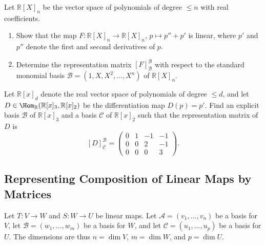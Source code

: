 \begin{exercise}
\label{exc:polynomial_differential_operator_matrix}
Let $\mathbb{R}[X]_n$ be the vector space of polynomials of degree $\le n$ with real coefficients.
\begin{enumerate}
    \item Show that the map $F \colon \mathbb{R}[X]_n \to \mathbb{R}[X]_n$, $p \mapsto p'' + p'$ is linear, where $p'$ and $p''$ denote the first and second derivatives of $p$.
    \item Determine the representation matrix $[F]_{\mathcal{B}}^{\mathcal{B}}$ with respect to the standard monomial basis $\mathcal{B} = (1, X, X^2, \dots, X^n)$ of $\mathbb{R}[X]_n$.
\end{enumerate}
\end{exercise}

\begin{exercise}
\label{exc:differentiation_customized_bases}
Let $\mathbb{R}[x]_d$ denote the real vector space of polynomials of degree $\le d$, and let $D \in \Hom_\mathbb{R}(\mathbb{R}[x]_3, \mathbb{R}[x]_2)$ be the differentiation map $D(p) = p'$.
Find an explicit basis $\mathcal{B}$ of $\mathbb{R}[x]_3$ and a basis $\mathcal{C}$ of $\mathbb{R}[x]_2$ such that the representation matrix of $D$ is
\[
[D]_{\mathcal{C}}^{\mathcal{B}} =
\begin{pmatrix}
0 & 1 & -1 & -1 \\
0 & 0 & 2 & -1 \\
0 & 0 & 0 & 3
\end{pmatrix}.
\]
\end{exercise}


\subsection{Representing Composition of Linear Maps by Matrices}

Let $T: V \to W$ and $S: W \to U$ be linear maps. Let $\mathcal{A} = (v_1, \dots, v_n)$ be a basis for $V$, let $\mathcal{B} = (w_1, \dots, w_m)$ be a basis for $W$, and let $\mathcal{C} = (u_1, \dots, u_p)$ be a basis for $U$. The dimensions are thus $n = \dim V$, $m = \dim W$, and $p = \dim U$.

